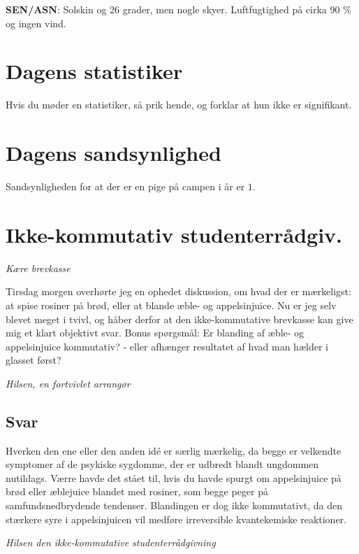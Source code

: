 \begin{minipage}[b]{0.95\linewidth}
\begin{minipage}[t]{0.47\textwidth}
\textbf{SEN/ASN}: Solskin og 26 grader, men nogle skyer. Luftfugtighed på cirka 90 \% og ingen vind.

\vspace{-2mm}
\section*{Dagens statistiker}
Hvis du møder en statistiker, så prik hende, og forklar at hun ikke er signifikant.

\vspace{-4mm}
\section*{Dagens sandsynlighed}
Sandsynligheden for at der er en pige på campen i år er $1$.

\vspace{-4mm}
\section*{Ikke-kommutativ studenterrådgiv.}
\emph{Kære brevkasse}

Tirsdag morgen overhørte jeg en ophedet diskussion, om hvad der er mærkeligst: at spise rosiner på brød, eller at blande æble- og appelsinjuice. Nu er jeg selv blevet meget i tvivl, og håber derfor at den ikke-kommutative brevkasse kan give mig et klart objektivt svar. Bonus spørgsmål: Er blanding af æble- og appelsinjuice kommutativ? - eller afhænger resultatet af hvad man hælder i glasset først?
 
\emph{Hilsen, en fortvivlet arrangør}

\vspace{-1mm}
\subsection*{Svar}
Hverken den ene eller den anden idé er særlig mærkelig, da begge er velkendte symptomer af de psykiske sygdomme, der er udbredt blandt ungdommen nutildags. Værre havde det stået til, hvis du havde spurgt om appelsinjuice på brød eller æblejuice blandet med rosiner, som begge peger på samfundsnedbrydende tendenser. Blandingen er dog ikke kommutativt, da den stærkere syre i appelsinjuicen vil medføre irreversible kvantekemiske reaktioner.

{\flushright\emph{Hilsen den ikke-kommutative studenterrådgivning}}


\end{minipage}
\end{minipage}
